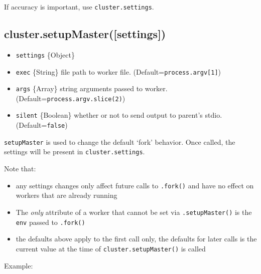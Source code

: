 If accuracy is important, use \texttt{cluster.settings}.

\subsection{cluster.setupMaster({[}settings{]})}\label{cluster.setupmastersettings}

\begin{itemize}
\itemsep1pt\parskip0pt
\item
  \texttt{settings} \{Object\}
\item
  \texttt{exec} \{String\} file path to worker file.
  (Default=\texttt{process.argv{[}1{]}})
\item
  \texttt{args} \{Array\} string arguments passed to worker.
  (Default=\texttt{process.argv.slice(2)})
\item
  \texttt{silent} \{Boolean\} whether or not to send output to parent's
  stdio. (Default=\texttt{false})
\end{itemize}

\texttt{setupMaster} is used to change the default `fork' behavior. Once
called, the settings will be present in \texttt{cluster.settings}.

Note that:

\begin{itemize}
\itemsep1pt\parskip0pt
\item
  any settings changes only affect future calls to \texttt{.fork()} and
  have no effect on workers that are already running
\item
  The \emph{only} attribute of a worker that cannot be set via
  \texttt{.setupMaster()} is the \texttt{env} passed to \texttt{.fork()}
\item
  the defaults above apply to the first call only, the defaults for
  later calls is the current value at the time of
  \texttt{cluster.setupMaster()} is called
\end{itemize}

Example:

\begin{Shaded}
\begin{Highlighting}[]
 \NormalTok{(}\NormalTok{);}
\NormalTok{(\{}
  \NormalTok{: }\NormalTok{,}
  \NormalTok{: [}\NormalTok{, }\NormalTok{],}
  \NormalTok{: }
\NormalTok{\});}
\NormalTok{(); }
\NormalTok{(\{}
  \NormalTok{: [}\NormalTok{, }\NormalTok{]}
\NormalTok{\});}
\NormalTok{(); }
\end{Highlighting}
\end{Shaded}

